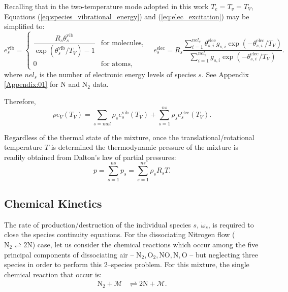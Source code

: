 \documentclass[10pt]{article}
\newcommand{\elec}{\text{elec}}
\newcommand{\vib}{\text{vib}}
\begin{document}
Recalling that  in the two-temperature mode adopted in this work $T_e=T_v= T_V$, Equations (\ref{eq:species_vibrational_energy}) and (\ref{eq:elec_excitation}) may be simplified to:
\begin{equation*}
  e^{\text{vib}}_s = 
  \begin{cases}    
    \dfrac{R_s\theta^{\vib}_{s}}{\exp\left(\theta^{\vib}_{s}/T_V\right) - 1} & \text{for molecules}, \\
    0 & \text{for atoms},
  \end{cases}
\quad
e^{\elec}_s = R_s \dfrac{\sum_{i=1}^{nel_s} \theta^{\elec}_{s,i} g_{s,i} \exp\left(-\theta^{\elec}_{s,i}/T_V\right)}{ \sum_{i=1}^{nel_s} g_{s,i} \exp\left(-\theta^{\elec}_{s,i}/T_V\right)}.
\end{equation*}
where $nel_s$ is the number of electronic energy levels of species $s$. See Appendix \ref{Appendix:01} for N and N$_2$ data.

Therefore, 
\begin{equation}
  \label{eq:rev-Tv-relationship}
  \rho e_V\left(T_V\right) = \sum_{s=mol} \rho_s e^{\text{vib}}_s\left(T_V\right) + \sum_{s=1}^{ns} \rho_s e^{\text{elec}}_s\left(T_V\right).
\end{equation}

Regardless of the thermal state of the mixture, once the translational/rotational temperature $T$ is determined the thermodynamic pressure of the mixture is readily obtained from Dalton's law of partial pressures:
\begin{equation}
 p = \sum_{s=1}^{ns} p_s = \sum_{s=1}^{ns} \rho_s R_s T .
 \label{eq:p_eq_state}
\end{equation}


\subsection{Chemical Kinetics}
The rate of production/destruction of the individual species $s$, $\dot{\omega}_s$, is required to close the species continuity equations. For the dissociating Nitrogen flow ($  \text{N}_2 \rightleftharpoons 2 \text{N}$) case, let us consider the chemical reactions which occur among the five principal components of dissociating air -- $\text{N}_2,\text{O}_2,\text{NO},\text{N},\text{O}$ -- but neglecting three species in order to perform this 2--species problem. For this mixture, the single chemical reaction that occur is:
\begin{align*}
 \text{N}_2 + \mathcal{M} &\rightleftharpoons 2\text{N} + \mathcal{M} .
\end{align*}
\end{document}
